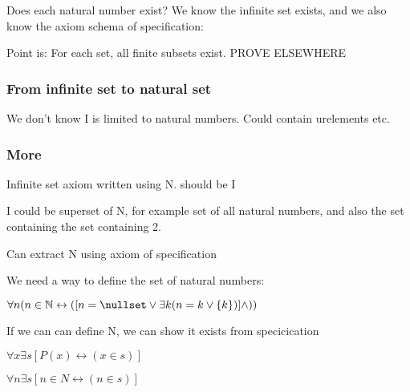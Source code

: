 Does each natural number exist? We know the infinite set exists, and we also know the axiom schema of specification:

Point is: For each set, all finite subsets exist. PROVE ELSEWHERE

\subsubsection{From infinite set to natural set}

We don’t know I is limited to natural numbers. Could contain urelements etc.

\subsubsection{More}

Infinite set axiom written using N. should be I


I could be superset of N, for example set of all natural numbers, and also the set containing the set containing 2.

Can extract N using axiom of specification

We need a way to define the set of natural numbers:

\(\forall n (n\in \mathbb{N}\leftrightarrow ([n=\nullset \lor \exists k (n=k\lor \{k\})]\land ))\)

If we can can define N, we can show it exists from specicication

\(\forall x \exists s [P(x)\leftrightarrow (x\in s)]\)

\(\forall n \exists s [n\in N \leftrightarrow (n\in s)]\)

